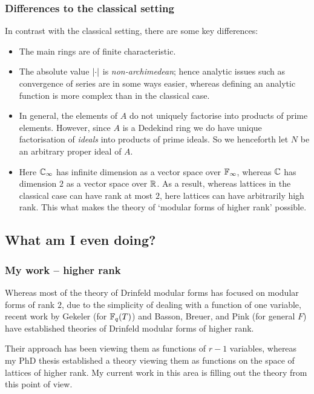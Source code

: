 \begin{frame} \frametitle{Differences to the classical setting}
  In contrast with the classical setting, there are some key differences: \pause
  \begin{itemize}
    \item The main rings are of finite characteristic. \pause
    \item The absolute value $\left\lvert\cdot\right\rvert$ is \emph{non-archimedean}; hence analytic issues such as convergence of series are in some ways easier, whereas defining an analytic function is more complex than in the classical case. \pause
    \item In general, the elements of $A$ do not uniquely factorise into products of prime elements. However, since $A$ is a Dedekind ring we do have unique factorisation of \emph{ideals} into products of prime ideals. \pause So we henceforth let $N$ be an arbitrary proper ideal of $A$.
    \item Here $\mathbb{C}_\infty$ has infinite dimension as a vector space over $\mathbb{F}_\infty$, whereas $\mathbb{C}$ has dimension $2$ as a vector space over $\mathbb{R}$. \pause
    As a result, whereas lattices in the classical case can have rank at most $2$, here lattices can have arbitrarily high rank. This what makes the theory of `modular forms of higher rank' possible.
  \end{itemize}
\end{frame}


\subsection{What am I even doing?}

\begin{frame} \frametitle{My work -- higher rank}
  Whereas most of the theory of Drinfeld modular forms has focused on modular forms of rank $2$, due to the simplicity of dealing with a function of one variable, recent work by Gekeler (for $\mathbb{F}_q(T)$) and Basson, Breuer, and Pink (for general $F$) have established theories of Drinfeld modular forms of higher rank. \pause
  
  Their approach has been viewing them as functions of $r-1$ variables, whereas my PhD thesis established a theory viewing them as functions on the space of lattices of higher rank. \pause
  My current work in this area is filling out the theory from this point of view.

\end{frame}


